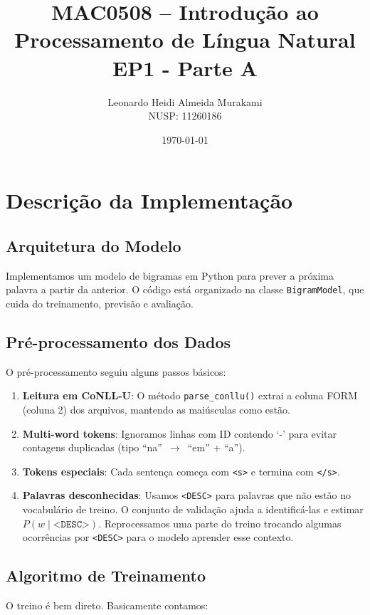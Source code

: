 \documentclass[12pt,a4paper]{article}
\title{\textbf{MAC0508 -- Introdução ao Processamento de Língua Natural}\\
\Large{EP1 - Parte A}}
\author{Leonardo Heidi Almeida Murakami \\ NUSP: 11260186}
\date{\today}
\begin{document}
\maketitle

\section{Descrição da Implementação}

\subsection{Arquitetura do Modelo}

Implementamos um modelo de bigramas em Python para prever a próxima palavra a partir da anterior. O código está organizado na classe \texttt{BigramModel}, que cuida do treinamento, previsão e avaliação.

\subsection{Pré-processamento dos Dados}

O pré-processamento seguiu alguns passos básicos:

\begin{enumerate}
    \item \textbf{Leitura em CoNLL-U}: O método \texttt{parse\_conllu()} extrai a coluna FORM (coluna 2) dos arquivos, mantendo as maiúsculas como estão.
    \item \textbf{Multi-word tokens}: Ignoramos linhas com ID contendo `-' para evitar contagens duplicadas (tipo ``na'' \,$\to$\, ``em'' + ``a'').
    \item \textbf{Tokens especiais}: Cada sentença começa com \texttt{<s>} e termina com \texttt{</s>}.
    \item \textbf{Palavras desconhecidas}: Usamos \texttt{<DESC>} para palavras que não estão no vocabulário de treino. O conjunto de validação ajuda a identificá-las e estimar $P(w\mid\texttt{<DESC>})$. Reprocessamos uma parte do treino trocando algumas ocorrências por \texttt{<DESC>} para o modelo aprender esse contexto.
\end{enumerate}

\subsection{Algoritmo de Treinamento}

O treino é bem direto. Basicamente contamos:
\end{document}
